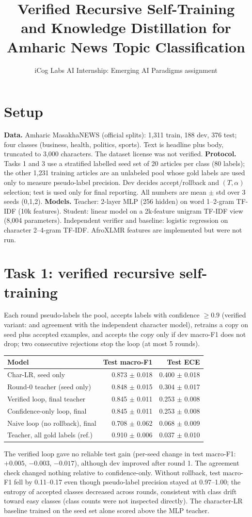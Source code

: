 \documentclass[10pt]{article}
\title{Verified Recursive Self-Training and Knowledge Distillation for Amharic News Topic Classification}
\author{iCog Labs AI Internship: Emerging AI Paradigms assignment}
\date{}
\begin{document}
\maketitle
\section{Setup}
\textbf{Data.} Amharic MasakhaNEWS (official splits): 1{,}311 train, 188 dev, 376 test; four classes (business, health, politics, sports). Text is headline plus body, truncated to 3{,}000 characters. The dataset license was not verified.
\textbf{Protocol.} Tasks 1 and 3 use a stratified labelled seed set of 20 articles per class (80 labels); the other 1{,}231 training articles are an unlabeled pool whose gold labels are used only to measure pseudo-label precision. Dev decides accept/rollback and $(T,\alpha)$ selection; test is used only for final reporting. All numbers are mean $\pm$ std over 3 seeds (0,1,2).
\textbf{Models.} Teacher: 2-layer MLP (256 hidden) on word 1--2-gram TF-IDF (10k features). Student: linear model on a 2k-feature unigram TF-IDF view (8{,}004 parameters). Independent verifier and baseline: logistic regression on character 2--4-gram TF-IDF. AfroXLMR features are implemented but were not run.
\section{Task 1: verified recursive self-training}
Each round pseudo-labels the pool, accepts labels with confidence $\ge 0.9$ (verified variant: and agreement with the independent character model), retrains a copy on seed plus accepted examples, and accepts the copy only if dev macro-F1 does not drop; two consecutive rejections stop the loop (at most 5 rounds).
\begin{center}\begin{tabular}{lrr}
\toprule
Model & Test macro-F1 & Test ECE \\
\midrule
Char-LR, seed only & 0.873 $\pm$ 0.018 & 0.400 $\pm$ 0.018 \\
Round-0 teacher (seed only) & 0.848 $\pm$ 0.015 & 0.304 $\pm$ 0.017 \\
Verified loop, final teacher & 0.845 $\pm$ 0.011 & 0.253 $\pm$ 0.008 \\
Confidence-only loop, final & 0.845 $\pm$ 0.011 & 0.253 $\pm$ 0.008 \\
Naive loop (no rollback), final & 0.708 $\pm$ 0.062 & 0.068 $\pm$ 0.009 \\
Teacher, all gold labels (ref.) & 0.910 $\pm$ 0.006 & 0.037 $\pm$ 0.010 \\
\bottomrule
\end{tabular}\end{center}
The verified loop gave no reliable test gain (per-seed change in test macro-F1: $+0.005$, $-0.003$, $-0.017$), although dev improved after round 1. The agreement check changed nothing relative to confidence-only. Without rollback, test macro-F1 fell by 0.11--0.17 even though pseudo-label precision stayed at 0.97--1.00; the entropy of accepted classes decreased across rounds, consistent with class drift toward easy classes (class counts were not inspected directly). The character-LR baseline trained on the seed set alone scored above the MLP teacher.
\end{document}
